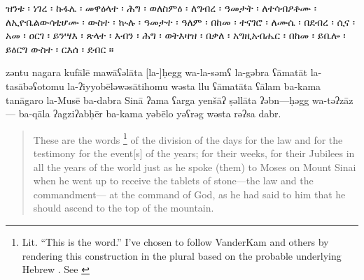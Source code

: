 \clearpage
\begin{ethiopictext}
        ዝንቱ ፡ ነገረ ፡ ኩፋሌ ፡
        መዋዕላተ ፡ ሕግ ፡ ወለስምዕ ፡
        ለግብረ ፡ ዓመታት ፡ ለተሳብዖቶሙ ፡ 
        ለኢዮቤልውሳቲሆሙ ፡ ውስተ ፡ ኲሉ ፡ ዓመታተ ፡ ዓለም ፡
        በከመ ፡ ተናገሮ ፡ ለሙሴ ፡ በደብረ ፡ ሲና ፡
        አመ ፡ ዐርገ ፡ ይንሣእ ፡ ጽላተ ፡ እብን ፡ ሕግ ፡ ወትእዛዝ ፡ 
        በቃለ ፡ አግዚአብሔር ፡ በከመ ፡ ይቤሎ ፡ ይዕርግ ውስተ ፡ ርእሰ ፡ ደብር ።
\end{ethiopictext}


\begin{transliteration}
        zəntu nagara kufālē
        mawāʕəlāta [la-]ḥegg wa-la-səmʕ
        la-gəbra ʕāmatāt la-tasābəʕotomu
        la-ʔiyyobēləwəsātihomu wəsta llu ʕāmatāta ʕālam
        ba-kama tanāgaro la-Musē ba-dabra Sinā
        ʔama ʕarga yenšāʔ ṣəllāta ʔəbn---ḥəgg wa-təʔzāz---%
        ba-qāla ʔagziʔabḥēr ba-kama yəbēlo yəʕrəg wəsta rəʔsa dabr.
\end{transliteration}

\begin{quote}
        These are the words%
        \footnote{Lit. ``This is the word.'' I've chosen to follow VanderKam and others by rendering this construction in the plural based on the probable underlying Hebrew . See \cite[125]{vanderkam2018}}
        of the division 
        of the days for the law and for the testimony
        for the event[s] of the years; for their weeks,
        for their Jubilees in all the years of the world
        just as he spoke (them) to Moses on Mount Sinai 
        when he went up to receive the tablets of stone---the law and the commandment---%
        at the command of God, as he had said to him 
        that he should ascend to the top of the mountain.
\end{quote}
%


